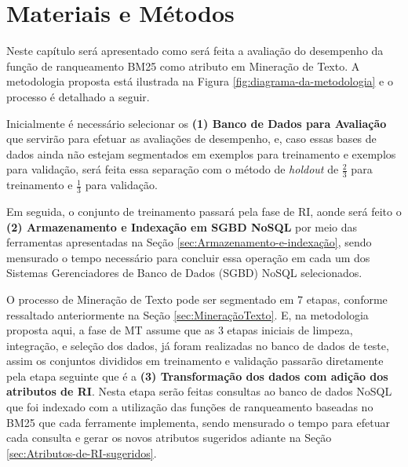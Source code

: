 \chapter{Materiais e Métodos} \label{ch:MateriaisMétodos} %
    Neste capítulo será apresentado como será feita a avaliação do desempenho da função de ranqueamento BM25 como atributo em Mineração de Texto.
    A metodologia proposta está ilustrada na Figura \ref{fig:diagrama-da-metodologia} e o processo é detalhado a seguir.
    
    
    
    Inicialmente é necessário selecionar os \textbf{(1) Banco de Dados para Avaliação} que servirão para efetuar as avaliações de desempenho, e, caso essas bases de dados ainda não estejam segmentados em exemplos para treinamento e exemplos para validação, será feita essa separação com o método de \textit{holdout} de $\frac{2}{3}$ para treinamento e $\frac{1}{3}$ para validação.
    
    Em seguida, o conjunto de treinamento passará pela fase de RI, aonde será feito o \textbf{(2) Armazenamento e Indexação em  SGBD NoSQL} por meio das ferramentas apresentadas na Seção  \ref{sec:Armazenamento-e-indexação}, sendo mensurado o tempo necessário para concluir essa operação em cada um dos Sistemas Gerenciadores de Banco de Dados (SGBD) NoSQL selecionados.
    
    O processo de Mineração de Texto pode ser segmentado em 7 etapas, conforme ressaltado anteriormente na Seção \ref{sec:MineraçãoTexto}.
    E, na metodologia proposta aqui, a fase de MT assume que as 3 etapas iniciais de limpeza, integração, e seleção dos dados, já foram realizadas no banco de dados de teste, assim os conjuntos divididos em treinamento e validação passarão diretamente pela etapa seguinte que é a \textbf{(3) Transformação dos dados com adição dos atributos de RI}.
    Nesta etapa serão feitas consultas ao banco de dados NoSQL que foi indexado com a utilização das funções de ranqueamento baseadas no BM25 que cada ferramente implementa, sendo mensurado o tempo para efetuar cada consulta e gerar os novos atributos sugeridos adiante na Seção \ref{sec:Atributos-de-RI-sugeridos}.
    
